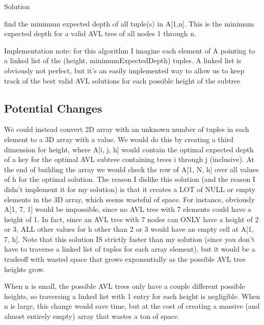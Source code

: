 \documentclass[a4paper]{article}
\begin{document}
Solution
\begin{myEnumerate}
\item  find the minimum expected depth of all tuple(s) in A[1,n]. This is the minimum expected depth for a valid AVL tree of all nodes 1 through n.
\end{myEnumerate}

Implementation note: for this algorithm I imagine each element of A pointing to a linked list of the (height, minimumExpectedDepth) tuples. A linked list is obviously not perfect, but it's an easily implemented way to allow us to keep track of the best valid AVL solutions for each possible height of the subtree

    

    
\subsection{Potential Changes}
We could instead convert 2D array with an unknown number of tuples in each element to a 3D array with a value. We would do this by creating a third dimension for height, where A[i, j, h] would contain the optimal expected depth of a key for the optimal AVL subtree containing trees i through j (inclusive). At the end of building the array we would check the row of A[1, N, h] over all values of h for the optimal solution. The reason I dislike this solution (and the reason I didn't implement it for my solution) is that it creates a LOT of NULL or empty elements in the 3D array, which seems wasteful of space. For instance, obviously A[1, 7, 1] would be impossible, since no AVL tree with 7 elements could have a height of 1. In fact, since an AVL tree with 7 nodes can ONLY have a height of 2 or 3, ALL other values for h other than 2 or 3 would have an empty cell at A[1, 7, h]. 
Note that this solution IS strictly faster than my solution (since you don't have to traverse a linked list of tuples for each array element), but it would be a tradeoff with wasted space that grows exponentially as the possible AVL tree heights grow.

When n is small, the possible AVL trees only have a couple different possible heights, so traversing a linked list with 1 entry for each height is negligible. When n is large, this change would save time, but at the cost of creating a massive (and almost entirely empty) array that wastes a ton of space.
\end{document}
